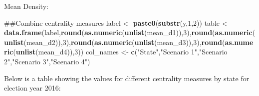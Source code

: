 \documentclass[]{article}
\newenvironment{Shaded}{\begin{snugshade}}{\end{snugshade}}
\newcommand{\KeywordTok}[1]{\textcolor[rgb]{0.13,0.29,0.53}{\textbf{#1}}}
\newcommand{\DataTypeTok}[1]{\textcolor[rgb]{0.13,0.29,0.53}{#1}}
\newcommand{\DecValTok}[1]{\textcolor[rgb]{0.00,0.00,0.81}{#1}}
\newcommand{\StringTok}[1]{\textcolor[rgb]{0.31,0.60,0.02}{#1}}
\newcommand{\OtherTok}[1]{\textcolor[rgb]{0.56,0.35,0.01}{#1}}
\newcommand{\OperatorTok}[1]{\textcolor[rgb]{0.81,0.36,0.00}{\textbf{#1}}}
\newcommand{\NormalTok}[1]{#1}
\begin{document}
Mean Density:

\begin{Shaded}
\begin{Highlighting}[]
\NormalTok{##Combine centrality measures}
\NormalTok{label <-}\StringTok{ }\KeywordTok{paste0}\NormalTok{(}\KeywordTok{substr}\NormalTok{(y,}\DecValTok{1}\NormalTok{,}\DecValTok{2}\NormalTok{))}
\NormalTok{table <-}\StringTok{ }\KeywordTok{data.frame}\NormalTok{(label,}\KeywordTok{round}\NormalTok{(}\KeywordTok{as.numeric}\NormalTok{(}\KeywordTok{unlist}\NormalTok{(mean_d1)),}\DecValTok{3}\NormalTok{),}\KeywordTok{round}\NormalTok{(}\KeywordTok{as.numeric}\NormalTok{(}\KeywordTok{unlist}\NormalTok{(mean_d2)),}\DecValTok{3}\NormalTok{),}\KeywordTok{round}\NormalTok{(}\KeywordTok{as.numeric}\NormalTok{(}\KeywordTok{unlist}\NormalTok{(mean_d3)),}\DecValTok{3}\NormalTok{),}\KeywordTok{round}\NormalTok{(}\KeywordTok{as.numeric}\NormalTok{(}\KeywordTok{unlist}\NormalTok{(mean_d4)),}\DecValTok{3}\NormalTok{))}
\NormalTok{col_names <-}\StringTok{ }\KeywordTok{c}\NormalTok{(}\StringTok{"State"}\NormalTok{,}\StringTok{"Scenario 1"}\NormalTok{,}\StringTok{"Scenario 2"}\NormalTok{,}\StringTok{"Scenario 3"}\NormalTok{,}\StringTok{"Scenario 4"}\NormalTok{)}
\end{Highlighting}
\end{Shaded}

Below is a table showing the values for different centrality measures by
state for election year 2016:

\begin{Shaded}
\end{Shaded}
\end{document}
